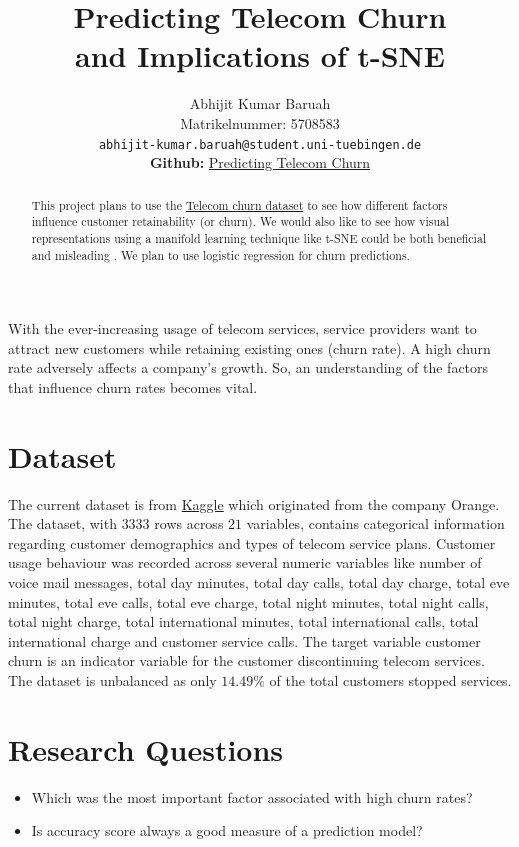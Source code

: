 \documentclass{article}
\title{Predicting Telecom Churn\\ and Implications of t-SNE}
\author{%
  Abhijit Kumar Baruah\\
  Matrikelnummer: 5708583\\
  \texttt{abhijit-kumar.baruah@student.uni-tuebingen.de} \\
  \textbf{Github: }\href{https://github.com/abhijit-baruah/Data_Literacy}{Predicting Telecom Churn}
}
\begin{document}
\maketitle

\begin{abstract}
	This project plans to use the  \href{https://www.kaggle.com/mnassrib/telecom-churn-datasets?select=churn-bigml-80.csv}{Telecom churn dataset} to see how different factors influence customer retainability (or churn). We would also like to see how visual representations using a manifold learning technique like t-SNE could be both beneficial and misleading . We plan to use logistic regression for churn predictions.
\end{abstract}

With the ever-increasing usage of telecom services, service providers want to attract new customers while retaining existing ones (churn rate). A high churn rate adversely affects a company's growth. So, an understanding of the factors that influence churn rates becomes vital. 
\section{Dataset}
The current dataset is from \href{https://www.kaggle.com/mnassrib/telecom-churn-datasets?select=churn-bigml-80.csv}{Kaggle} which originated from the company Orange. The dataset, with $3333$ rows across $21$ variables, contains categorical information regarding customer demographics and types of telecom service plans. Customer usage behaviour was recorded across several numeric variables like number of voice mail messages, total day minutes, total day calls, total day charge, total eve minutes, total eve calls, total eve charge, total night minutes, total night calls, total night charge, total international minutes, total international calls, total international charge and customer service calls. The target variable customer churn is an indicator variable for the customer discontinuing telecom services. The dataset is unbalanced as only $14.49\%$ of the total customers stopped services.

\section{Research Questions}
\begin{itemize}
	\item Which was the most important factor associated with high churn rates?
	\item Is accuracy score always a good measure of a prediction model?
\end{itemize}
\end{document}
